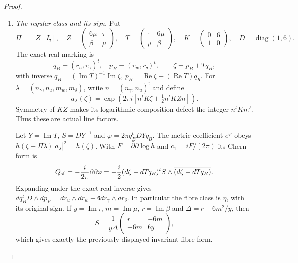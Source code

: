 \begin{proof}
\begin{enumerate}[label=\arabic*.,leftmargin=*]
\item \emph{The regular class and its sign.}
Put
\[
 \Pi=[Z\mid I_2],\quad
 Z=\begin{pmatrix}6\mu&\tau\\\beta&\mu\end{pmatrix},\quad
 T=\begin{pmatrix}\tau&6\mu\\\mu&\beta\end{pmatrix},\quad
 K=\begin{pmatrix}0&6\\1&0\end{pmatrix},\quad D=\operatorname{diag}(1,6).
\]
The exact real marking is
\[
 q_B=(r_u,r_\gamma)^t,\quad p_B=(r_w,r_\delta)^t,
 \qquad \zeta=p_B+Tq_B,
\]
with inverse $q_B=(\operatorname{Im}T)^{-1}\operatorname{Im}\zeta$,
$p_B=\operatorname{Re}\zeta-(\operatorname{Re}T)q_B$.
For $\lambda=(n_\gamma,n_u,m_w,m_\delta)$, write
$n=(n_\gamma,n_u)^t$ and define
\begin{equation}\label{inv:eq:atlas-theta-factor}
 a_\lambda(\zeta)=
 \exp\left(2\pi i\left[n^tK\zeta+\tfrac12 n^tKZn\right]\right).
\end{equation}
Symmetry of $KZ$ makes its logarithmic composition defect the integer
$n^tK m'$.  Thus these are actual line factors.

Let $Y=\operatorname{Im}T$, $S=DY^{-1}$ and
$\varphi=2\pi q_B^tDYq_B$.  The metric coefficient $e^\varphi$
obeys $h(\zeta+\Pi\lambda)|a_\lambda|^2=h(\zeta)$.
With $F=\bar\partial\partial\log h$ and $c_1=iF/(2\pi)$ its
Chern form is
\begin{equation}\label{inv:eq:atlas-semiflat}
 Q_{\rm sf}=-\frac{i}{2\pi}\partial\bar\partial\varphi
 =-\frac i2(d\zeta-dTq_B)^tS\wedge
             \overline{(d\zeta-dTq_B)}.
\end{equation}
Expanding under the exact real inverse gives
$dq_B^tD\wedge dp_B=dr_u\wedge dr_w+6dr_\gamma\wedge dr_\delta$.
In particular the fibre class is $\eta$, with its original sign.
If $y=\operatorname{Im}\tau$, $m=\operatorname{Im}\mu$,
$r=\operatorname{Im}\beta$ and $\Delta=r-6m^2/y$, then
\[
 S=\frac1{y\Delta}
 \begin{pmatrix}r&-6m\\-6m&6y\end{pmatrix},
\]
which gives exactly the previously displayed invariant fibre form.


\end{enumerate}
\end{proof}
